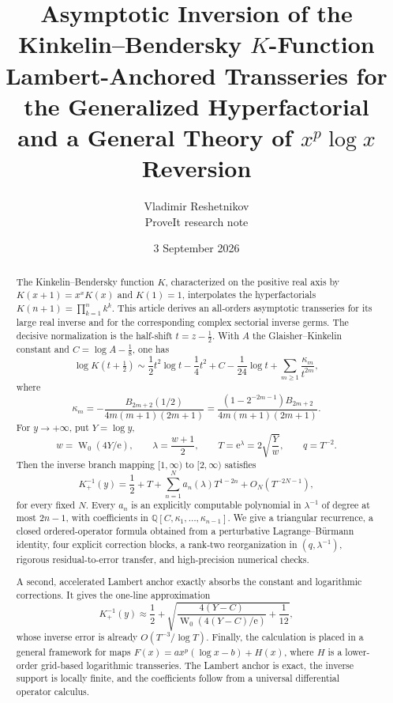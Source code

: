\documentclass[11pt,oneside]{article}
\theoremstyle{plain}
\theoremstyle{definition}
\theoremstyle{remark}
\newcommand{\W}{\operatorname{W}}
\newcommand{\e}{\mathrm{e}}
\newcommand{\Q}{\mathbb{Q}}
\begin{document}
\title{\textbf{Asymptotic Inversion of the Kinkelin--Bendersky \(K\)-Function}\\[0.35em]
  \Large Lambert-Anchored Transseries for the Generalized Hyperfactorial\\
  and a General Theory of \(x^p\log x\) Reversion}
\author{Vladimir Reshetnikov\\
  \small ProveIt research note}
\date{3 September 2026}
\maketitle

\begin{abstract}
The Kinkelin--Bendersky function \(K\), characterized on the positive real axis by
\(K(x+1)=x^xK(x)\) and \(K(1)=1\), interpolates the hyperfactorials
\(K(n+1)=\prod_{k=1}^n k^k\).  This article derives an all-orders asymptotic
transseries for its large real inverse and for the corresponding complex
sectorial inverse germs.  The decisive normalization is the half-shift
\(t=z-\tfrac12\).  With \(A\) the Glaisher--Kinkelin constant and
\(C=\log A-\tfrac18\), one has
\[
 \log K\!\left(t+\tfrac12\right)
 \sim \frac12t^2\log t-\frac14t^2+C-\frac1{24}\log t
      +\sum_{m\ge1}\frac{\kappa_m}{t^{2m}},
\]
where
\[
 \kappa_m=-\frac{B_{2m+2}(1/2)}{4m(m+1)(2m+1)}
 =\frac{(1-2^{-2m-1})B_{2m+2}}{4m(m+1)(2m+1)}.
\]
For \(y\to+\infty\), put \(Y=\log y\),
\[
 w=\W_0(4Y/\e),\qquad \lambda=\frac{w+1}{2},\qquad
 T=\e^\lambda=2\sqrt{\frac{Y}{w}},\qquad q=T^{-2}.
\]
Then the inverse branch mapping \([1,\infty)\) to \([2,\infty)\) satisfies
\[
 K_+^{-1}(y)=\frac12+T+\sum_{n=1}^{N}a_n(\lambda)T^{1-2n}
              +O_N(T^{-2N-1}),
\]
for every fixed \(N\).  Every \(a_n\) is an explicitly computable polynomial in
\(\lambda^{-1}\) of degree at most \(2n-1\), with coefficients in
\(\Q[C,\kappa_1,\ldots,\kappa_{n-1}]\).  We give a triangular recurrence, a
closed ordered-operator formula obtained from a perturbative
Lagrange--B\"urmann identity, four explicit correction blocks, a rank-two
reorganization in \((q,\lambda^{-1})\), rigorous residual-to-error transfer,
and high-precision numerical checks.

A second, accelerated Lambert anchor exactly absorbs the constant and logarithmic
corrections.  It gives the one-line approximation
\[
 K_+^{-1}(y)\approx \frac12+
 \sqrt{\frac{4(Y-C)}{\W_0(4(Y-C)/\e)}+\frac1{12}},
\]
whose inverse error is already \(O(T^{-3}/\log T)\).  Finally, the calculation is
placed in a general framework for maps
\(F(x)=a x^p(\log x-b)+H(x)\), where \(H\) is a lower-order grid-based
logarithmic transseries.  The Lambert anchor is exact, the inverse support is
locally finite, and the coefficients follow from a universal differential
operator calculus.
\end{abstract}
\end{document}
